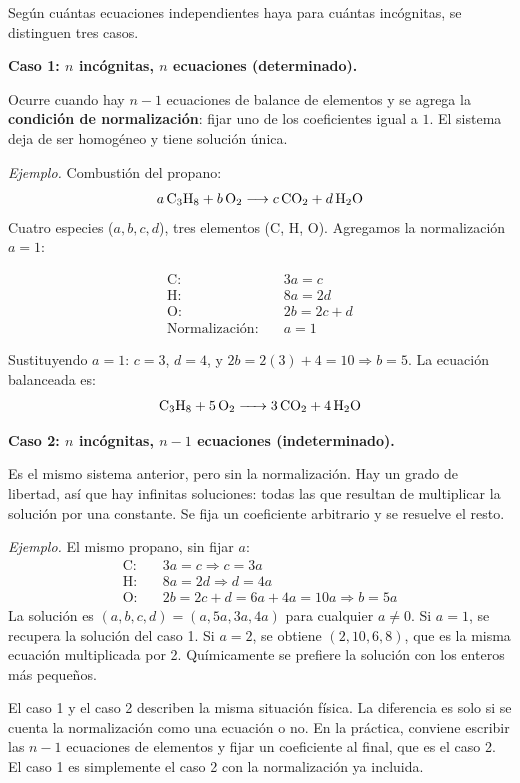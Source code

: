 Según cuántas ecuaciones independientes haya para cuántas
incógnitas, se distinguen tres casos.

\medskip
\textbf{Caso 1: $n$ incógnitas, $n$ ecuaciones (determinado).}

Ocurre cuando hay $n-1$ ecuaciones de balance de elementos y se
agrega la \textbf{condición de normalización}: fijar uno de los
coeficientes igual a $1$. El sistema deja de ser homogéneo y
tiene solución única.

\textit{Ejemplo.} Combustión del propano:
\[
a\,\ce{C3H8} + b\,\ce{O2} \longrightarrow c\,\ce{CO2} + d\,\ce{H2O}
\]
Cuatro especies ($a,b,c,d$), tres elementos (C, H, O). Agregamos
la normalización $a=1$:

\begin{align*}
\text{C:} &\quad 3a = c \\
\text{H:} &\quad 8a = 2d \\
\text{O:} &\quad 2b = 2c + d \\
\text{Normalización:} &\quad a = 1
\end{align*}

Sustituyendo $a=1$: $c=3$, $d=4$, y
$2b = 2(3)+4 = 10 \Rightarrow b=5$. La ecuación balanceada es:
\[
\ce{C3H8 + 5O2 -> 3CO2 + 4H2O}
\]

\medskip
\textbf{Caso 2: $n$ incógnitas, $n-1$ ecuaciones (indeterminado).}

Es el mismo sistema anterior, pero sin la normalización. Hay un
grado de libertad, así que hay infinitas soluciones: todas las
que resultan de multiplicar la solución por una constante. Se
fija un coeficiente arbitrario y se resuelve el resto.

\textit{Ejemplo.} El mismo propano, sin fijar $a$:
\begin{align*}
\text{C:} &\quad 3a = c \Rightarrow c = 3a \\
\text{H:} &\quad 8a = 2d \Rightarrow d = 4a \\
\text{O:} &\quad 2b = 2c + d = 6a + 4a = 10a \Rightarrow b = 5a
\end{align*}
La solución es $(a,b,c,d) = (a, 5a, 3a, 4a)$ para cualquier
$a \neq 0$. Si $a=1$, se recupera la solución del caso 1. Si
$a=2$, se obtiene $(2,10,6,8)$, que es la misma ecuación
multiplicada por 2. Químicamente se prefiere la solución con los
enteros más pequeños.

\begin{notaimportante}
El caso 1 y el caso 2 describen la misma situación física. La
diferencia es solo si se cuenta la normalización como una
ecuación o no. En la práctica, conviene escribir las $n-1$
ecuaciones de elementos y fijar un coeficiente al final, que es
el caso 2. El caso 1 es simplemente el caso 2 con la
normalización ya incluida.
\end{notaimportante}


